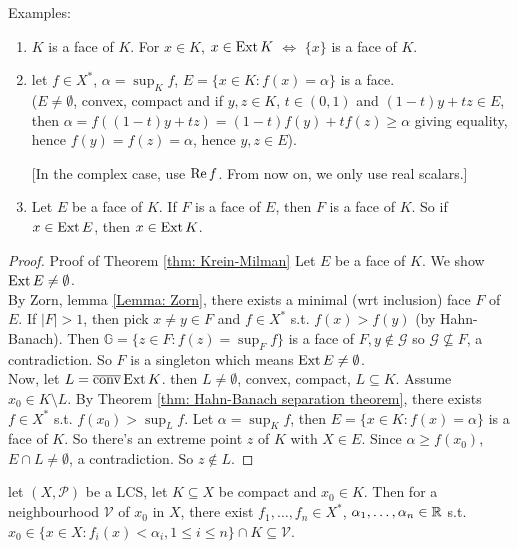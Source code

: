 \documentclass{article}
\begin{document}
\begin{examplesblock}{Examples:}\label{examples: 12}
    \begin{enumerate}
        \item $K$ is a face of $K$. For $x\in K$, $x\in \operatorname{Ext} K$ $\iff$ $\{x\}$ is a face of $K$.
        \item let $f\in X^*$, $\alpha = \displaystyle\sup_K f$, $E = \{x\in K: f(x) = \alpha\}$ is a face.\\
        ($E\neq \emptyset$, convex, compact and if $y,z\in K$, $t\in (0,1)$ and $(1-t)y+tz\in E$, then $\alpha = f((1-t)y+tz) = (1-t)f(y)+tf(z)\geq \alpha$ giving equality, hence $f(y)=f(z)=\alpha$, hence $y,z\in E$).
        \begin{center}
        [In the complex case, use $\operatorname{Re} f$. From now on, we only use real scalars.]
        \end{center}
        \item Let $E$ be a face of $K$. If $F$ is a face of $E$, then $F$ is a face of $K$. So if $x\in \operatorname{Ext} E$, then $x\in \operatorname{Ext} K$.
    \end{enumerate}
\end{examplesblock}

\begin{proof}{Proof of Theorem \ref{thm: Krein-Milman}}
    Let $E$ be a face of $K$. We show $\operatorname{Ext} E\neq \emptyset$.\\

    By Zorn, lemma \ref{Lemma: Zorn}, there exists a minimal (wrt inclusion) face $F$ of $E$. If $|F|>1$, then pick $x\neq y\in F$ and $f\in X^*$ s.t. $f(x)>f(y)$ (by Hahn-Banach). Then $\mathbb{G}=\{z\in F: f(z)=\displaystyle\sup_F f\}$ is a face of $F, y\not\in \mathcal{G}$ so $\mathcal{G}\not\subseteq F$, a contradiction. So $F$ is a singleton which means $\operatorname{Ext} E \neq \emptyset$.\\

    Now, let $L = \overline{\operatorname{conv}}\operatorname{Ext} K$. then $L\neq \emptyset$, convex, compact, $L\subseteq K$. Assume $x_0\in K\setminus L$. By Theorem \ref{thm: Hahn-Banach separation theorem}, there exists $f\in X^*$ s.t. $f(x_0)>\displaystyle\sup_L f$. Let $\alpha = \displaystyle\sup_K f$, then $E = \{x\in K: f(x)=\alpha\}$ is a face of $K$. So there's an extreme point $z$ of $K$ with $X\in E$. Since $\alpha \geq f(x_0)$, $E\cap L\neq \emptyset $,  a contradiction. So $z\not\in L$.
\end{proof}

\begin{boxlemma}\label{lemma: LCS topology}
     let $(X, \mathcal{P})$ be a LCS, let $K\subseteq X$ be compact and $x_0\in K$. Then for a neighbourhood $\mathcal{V}$ of $x_0$ in $X$, there exist $f_1, \dots, f_n\in X^*$, $\alpha_1, \dots, \alpha_n\in \mathbb{R}$ s.t. $x_0\in \{x\in X: f_i(x)<\alpha_i, 1\leq i \leq n\}\cap K\subseteq \mathcal{V}$.
\end{boxlemma}
\end{document}
